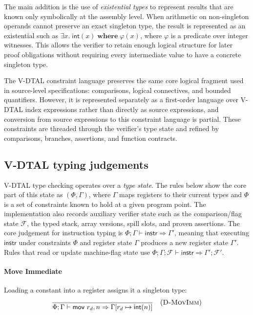 The main addition is the use of \textit{existential types} to represent results that are known only symbolically at the assembly level. When arithmetic on non-singleton operands cannot preserve an exact singleton type, the result is represented as an existential such as $\exists x.\; \textsf{int}(x) \;\mathbf{where}\; \varphi(x)$, where $\varphi$ is a predicate over integer witnesses. This allows the verifier to retain enough logical structure for later proof obligations without requiring every intermediate value to have a concrete singleton type.

The V-DTAL constraint language preserves the same core logical fragment used in source-level specifications: comparisons, logical connectives, and bounded quantifiers. However, it is represented separately as a first-order language over V-DTAL index expressions rather than directly as source expressions, and conversion from source expressions to this constraint language is partial. These constraints are threaded through the verifier's type state and refined by comparisons, branches, assertions, and function contracts.

\subsection{V-DTAL typing judgements}

V-DTAL type checking operates over a \textit{type state}. The rules below show the core part of this state as $(\Phi, \Gamma)$, where $\Gamma$ maps registers to their current types and $\Phi$ is a set of constraints known to hold at a given program point. The implementation also records auxiliary verifier state such as the comparison/flag state $\mathcal{F}$, the typed stack, array versions, spill slots, and proven assertions. The core judgement for instruction typing is $\Phi; \Gamma \vdash \textsf{instr} \Rightarrow \Gamma'$, meaning that executing $\textsf{instr}$ under constraints $\Phi$ and register state $\Gamma$ produces a new register state $\Gamma'$. Rules that read or update machine-flag state use $\Phi; \Gamma; \mathcal{F} \vdash \textsf{instr} \Rightarrow \Gamma'; \mathcal{F}'$.

\paragraph{Move Immediate}
Loading a constant into a register assigns it a singleton type:
$$
\frac{}{\Phi; \Gamma \vdash \textsf{mov } r_d, n \Rightarrow \Gamma[r_d \mapsto \textsf{int}(n)]} \quad (\textsc{D-MovImm})
$$

